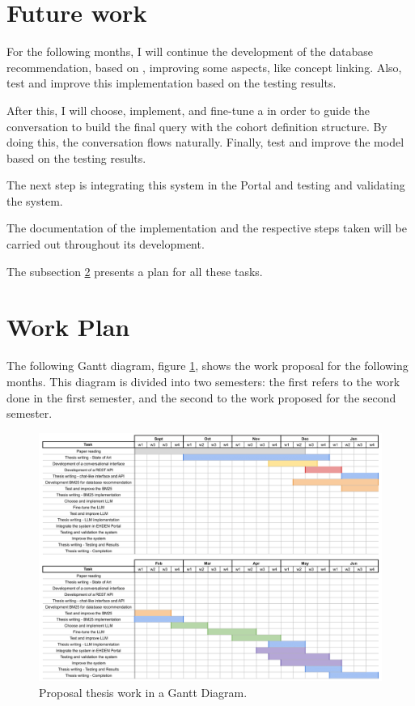 \section{Future work}

For the following months, I will continue the development of the database recommendation, based on {\bm}, improving some aspects, like concept linking. Also, test and improve this {\ir} implementation based on the testing results. 

After this, I will choose, implement, and fine-tune a {\llm} in order to guide the conversation to build the final query with the cohort definition structure. By doing this, the conversation flows naturally. Finally, test and improve the model based on the testing results.

The next step is integrating this system in the {\ehden} Portal and testing and validating the system. 

The documentation of the implementation and the respective steps taken will be carried out throughout its development.

The subsection \ref{workplan} presents a plan for all these tasks.


\section{Work Plan}
\label{workplan}

The following Gantt diagram, figure \ref{fig_gantt}, shows the work proposal for the following months. This diagram is divided into two semesters: the first refers to the work done in the first semester, and the second to the work proposed for the second semester.

\begin{figure}[ht]
    \includegraphics[width=16cm]{figs/chapter3/diagram_gantt.png}
    \centering
    \caption{Proposal thesis work in a Gantt Diagram.}
    \label{fig_gantt}
\end{figure}